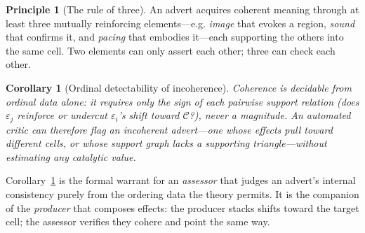 \documentclass[twocolumn,11pt,a4paper]{article}
\theoremstyle{adv}
\newtheorem{corollary}[theorem]{Corollary}
\theoremstyle{definition}
\newtheorem{principle}[theorem]{Principle}
\theoremstyle{remark}
\newcommand{\Cell}{\mathcal{C}}        %
\newcommand{\Eff}{\varepsilon}        %
\begin{document}
\begin{principle}[The rule of three]
\label{prin:three}
An advert acquires coherent meaning through at least three mutually
reinforcing elements---e.g. \emph{image} that evokes a region,
\emph{sound} that confirms it, and \emph{pacing} that embodies it---each
supporting the others into the same cell. Two elements can only assert each
other; three can check each other.
\end{principle}

\begin{corollary}[Ordinal detectability of incoherence]
\label{cor:detect}
Coherence is decidable from ordinal data alone: it requires only the
sign of each pairwise support relation (does $\Eff_j$ reinforce or
undercut $\Eff_i$'s shift toward $\Cell$?), never a magnitude. An automated
critic can therefore flag an incoherent advert---one whose effects pull
toward different cells, or whose support graph lacks a supporting
triangle---without estimating any catalytic value.
\end{corollary}

Corollary~\ref{cor:detect} is the formal warrant for an \emph{assessor}
that judges an advert's internal consistency purely from the ordering data
the theory permits. It is the companion of the \emph{producer} that
composes effects: the producer stacks shifts toward the target cell; the
assessor verifies they cohere and point the same way.
\end{document}
